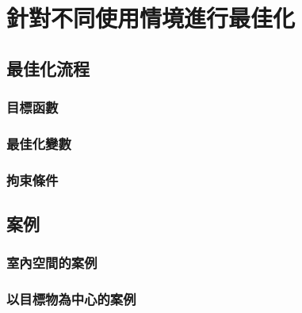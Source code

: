 \chapter{針對不同使用情境進行最佳化}
\label{chp:5}

\section{最佳化流程}

    \subsection{目標函數}

    \subsection{最佳化變數}

    \subsection{拘束條件}

\section{案例}

    \subsection{室內空間的案例}

    \subsection{以目標物為中心的案例}





